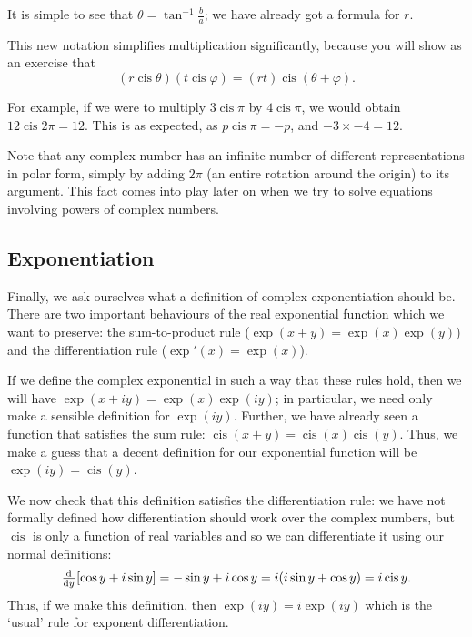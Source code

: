 \documentclass[a4paper,10pt,titlepage]{article}
\theoremstyle{definition}
\DeclareMathOperator{\cis}{cis}
\begin{document}
It is simple to see that $ \theta = \tan^{-1}{\frac{b}{a}} $; we have already got a formula for $ r $.

This new notation simplifies multiplication significantly, because you will show as an exercise that
\begin{displaymath}
  (r \cis \theta)(t \cis \varphi) = (rt) \cis (\theta + \varphi).
\end{displaymath}

For example, if we were to multiply $ 3 \cis \pi $ by $ 4 \cis \pi $, we would obtain $ 12 \cis 2\pi = 12 $. This is as expected,
as $ p \cis \pi = -p $, and $ -3 \times -4 = 12 $.

Note that any complex number has an infinite number of different representations in polar form, simply by adding $ 2\pi $ (an entire
rotation around the origin) to its argument. This fact comes into play later on when we try to solve equations involving powers of complex
numbers.

\subsection*{Exponentiation}
Finally, we ask ourselves what a definition of complex exponentiation should be. There are two important
behaviours of the real exponential function which we want to preserve: the sum-to-product rule ($ \exp(x + y) = \exp(x) \exp(y) $)
and the differentiation rule ($ \exp'(x) = \exp(x) $).

If we define the complex exponential in such a way that these rules hold, then we will have $ \exp(x + iy) = \exp(x) \exp(iy) $;
in particular, we need only make a sensible definition for $ \exp(iy) $. Further, we have already seen a function that satisfies the sum
rule: $ \cis(x + y) = \cis(x) \cis(y) $. Thus, we make a guess that a decent definition for our exponential function will be $ \exp(iy) = \cis(y) $.

We now check that this definition satisfies the differentiation rule: we have not formally defined how differentiation should work over the
complex numbers, but $ \cis $ is only a function of real variables and so we can differentiate it using our normal definitions:
\begin{displaymath}
  \od{}{y} [\cos y + i\sin y] = -\sin y + i\cos y = i(i\sin y + \cos y) = i\cis y.
\end{displaymath}
Thus, if we make this definition, then $ \exp(iy) = i\exp(iy) $ which is the `usual' rule for exponent differentiation.
\end{document}
